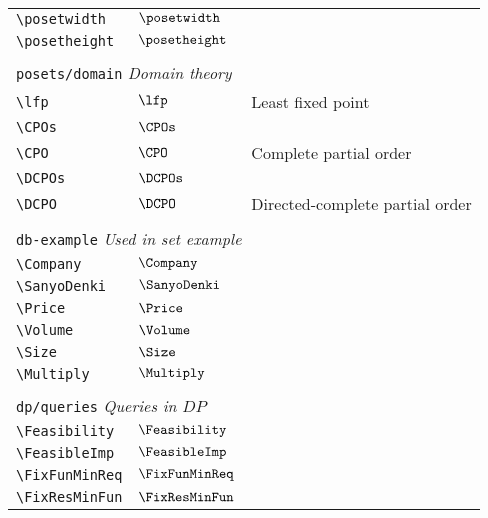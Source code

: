 \begin{longtable}{lll}
 \hline
{\color[rgb]{0.5,0.5,0.5}\texttt{\textbackslash posetwidth}} & $\posetwidth$ & \\ 
 {\color[rgb]{0.5,0.5,0.5}\texttt{\textbackslash posetheight}} & $\posetheight$ & \\ 
  &  & \\ 
 \multicolumn{3}{l}{{\color[rgb]{0.5,0.5,0.5}\texttt{posets/domain}} \emph{Domain theory}}\\ 
 \hline
{\color[rgb]{0.5,0.5,0.5}\texttt{\textbackslash lfp}} & $\lfp$ &  Least fixed point\\ 
 {\color[rgb]{0.5,0.5,0.5}\texttt{\textbackslash CPOs}} & $\CPOs$ & \\ 
 {\color[rgb]{0.5,0.5,0.5}\texttt{\textbackslash CPO}} & $\CPO$ &  Complete partial order\\ 
 {\color[rgb]{0.5,0.5,0.5}\texttt{\textbackslash DCPOs}} & $\DCPOs$ & \\ 
 {\color[rgb]{0.5,0.5,0.5}\texttt{\textbackslash DCPO}} & $\DCPO$ &  Directed-complete partial order\\ 
  &  & \\ 
 \multicolumn{3}{l}{{\color[rgb]{0.5,0.5,0.5}\texttt{db-example}} \emph{Used in set example}}\\ 
 \hline
\hline
{\color[rgb]{0.5,0.5,0.5}\texttt{\textbackslash Company}} & $\Company$ & \\ 
 {\color[rgb]{0.5,0.5,0.5}\texttt{\textbackslash SanyoDenki}} & $\SanyoDenki$ & \\ 
 {\color[rgb]{0.5,0.5,0.5}\texttt{\textbackslash Price}} & $\Price$ & \\ 
 {\color[rgb]{0.5,0.5,0.5}\texttt{\textbackslash Volume}} & $\Volume$ & \\ 
 {\color[rgb]{0.5,0.5,0.5}\texttt{\textbackslash Size}} & $\Size$ & \\ 
 {\color[rgb]{0.5,0.5,0.5}\texttt{\textbackslash Multiply}} & $\Multiply$ & \\ 
  &  & \\ 
 \multicolumn{3}{l}{{\color[rgb]{0.5,0.5,0.5}\texttt{dp/queries}} \emph{Queries in $DP$}}\\ 
 \hline
{\color[rgb]{0.5,0.5,0.5}\texttt{\textbackslash Feasibility}} & $\Feasibility$ & \\ 
 {\color[rgb]{0.5,0.5,0.5}\texttt{\textbackslash FeasibleImp}} & $\FeasibleImp$ & \\ 
 {\color[rgb]{0.5,0.5,0.5}\texttt{\textbackslash FixFunMinReq}} & $\FixFunMinReq$ & \\ 
 {\color[rgb]{0.5,0.5,0.5}\texttt{\textbackslash FixResMinFun}} & $\FixResMinFun$ & \\ 

\end{longtable}
